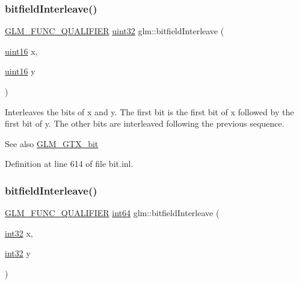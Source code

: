 \subsubsection{\texorpdfstring{bitfield\+Interleave()}{bitfieldInterleave()}\hspace{0.1cm}{\footnotesize\ttfamily [4/16]}}
{\footnotesize\ttfamily \hyperlink{setup_8hpp_a33fdea6f91c5f834105f7415e2a64407}{G\+L\+M\+\_\+\+F\+U\+N\+C\+\_\+\+Q\+U\+A\+L\+I\+F\+I\+ER} \hyperlink{group__gtc__type__precision_ga202b6a53c105fcb7e531f9b443518451}{uint32} glm\+::bitfield\+Interleave (\begin{DoxyParamCaption}\item[{\hyperlink{group__gtc__type__precision_gad8c2939e1fdd8e5828b31d95c52255d5}{uint16}}]{x,  }\item[{\hyperlink{group__gtc__type__precision_gad8c2939e1fdd8e5828b31d95c52255d5}{uint16}}]{y }\end{DoxyParamCaption})}

Interleaves the bits of x and y. The first bit is the first bit of x followed by the first bit of y. The other bits are interleaved following the previous sequence.

\begin{DoxySeeAlso}{See also}
\hyperlink{group__gtx__bit}{G\+L\+M\+\_\+\+G\+T\+X\+\_\+bit} 
\end{DoxySeeAlso}


Definition at line 614 of file bit.\+inl.

\mbox{\label{group__gtx__bit_ga0de51d5985e6a703f305a5a61479babd}} 
\subsubsection{\texorpdfstring{bitfield\+Interleave()}{bitfieldInterleave()}\hspace{0.1cm}{\footnotesize\ttfamily [5/16]}}
{\footnotesize\ttfamily \hyperlink{setup_8hpp_a33fdea6f91c5f834105f7415e2a64407}{G\+L\+M\+\_\+\+F\+U\+N\+C\+\_\+\+Q\+U\+A\+L\+I\+F\+I\+ER} \hyperlink{group__gtc__type__precision_ga435d75819cce297cc5fa21bd84ef89a5}{int64} glm\+::bitfield\+Interleave (\begin{DoxyParamCaption}\item[{\hyperlink{group__gtc__type__precision_ga632d8b25f6b61659f39ea4321fab92a4}{int32}}]{x,  }\item[{\hyperlink{group__gtc__type__precision_ga632d8b25f6b61659f39ea4321fab92a4}{int32}}]{y }\end{DoxyParamCaption})}

